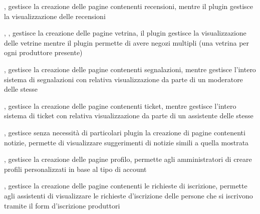 
{, }
{ gestisce la creazione delle pagine contenenti recensioni, mentre il plugin  gestisce la visualizzazione delle recensioni}


{, , }
{ gestisce la creazione delle pagine vetrina, il plugin  gestisce la visualizzazione delle vetrine mentre il plugin  permette di avere negozi multipli (una vetrina per ogni produttore presente)}


{, }
{ gestisce la creazione delle pagine contenenti segnalazioni, mentre  gestisce l'intero sistema di segnalazioni con relativa visualizzazione da parte di un moderatore delle stesse}


{, }
{ gestisce la creazione delle pagine contenenti ticket, mentre  gestisce l'intero sistema di ticket con relativa visualizzazione da parte di un assistente delle stesse}


{, }
{ gestisce senza necessità di particolari plugin la creazione di pagine contenenti notizie,  permette di visualizzare suggerimenti di notizie simili a quella mostrata}


{, }
{ gestisce la creazione delle pagine profilo,  permette agli amministratori di creare profili personalizzati in base al tipo di account}


{, }
{ gestisce la creazione delle pagine contenenti le richieste di iscrizione,  permette agli assistenti di visualizzare le richieste d'iscrizione delle persone che si iscrivono tramite il form d'iscrizione produttori}

